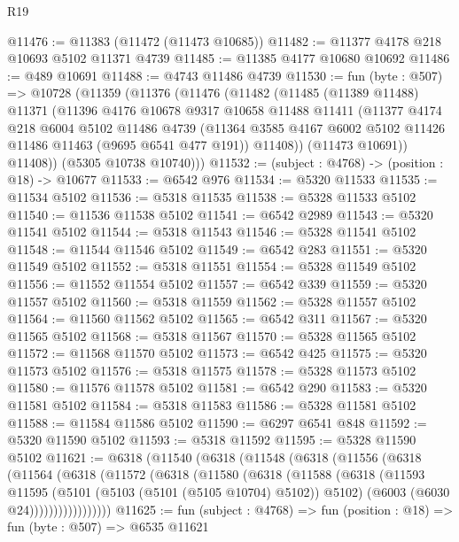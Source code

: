 \begin{lexlean}{R19}
\begin{coremodule}
{{{{{{{{{{{@11476 := @11383 (@11472 (@11473 @10685))
@11482 := @11377 @4178 @218 @10693 @5102 @11371 @4739
@11485 := @11385 @4177 @10680 @10692
@11486 := @489 @10691
@11488 := @4743 @11486 @4739
@11530 := fun (byte : @507) =>
  @10728
    (@11359
      (@11376
        (@11476
          (@11482
            (@11485
              (@11389 @11488)
              @11371
              (@11396
                @4176
                @10678
                @9317
                @10658
                @11488
                @11411
                (@11377
                  @4174
                  @218
                  @6004
                  @5102
                  @11486
                  @4739
                  (@11364 @3585 @4167 @6002 @5102 @11426 @11486 @11463 (@9695 @6541 @477 @191))
                  @11408))
              (@11473 @10691))
            @11408))
        (@5305 @10738 @10740)))
@11532 := (subject : @4768) -> (position : @18) -> @10677
@11533 := @6542 @976
@11534 := @5320 @11533
@11535 := @11534 @5102
@11536 := @5318 @11535
@11538 := @5328 @11533 @5102
@11540 := @11536 @11538 @5102
@11541 := @6542 @2989
@11543 := @5320 @11541 @5102
@11544 := @5318 @11543
@11546 := @5328 @11541 @5102
@11548 := @11544 @11546 @5102
@11549 := @6542 @283
@11551 := @5320 @11549 @5102
@11552 := @5318 @11551
@11554 := @5328 @11549 @5102
@11556 := @11552 @11554 @5102
@11557 := @6542 @339
@11559 := @5320 @11557 @5102
@11560 := @5318 @11559
@11562 := @5328 @11557 @5102
@11564 := @11560 @11562 @5102
@11565 := @6542 @311
@11567 := @5320 @11565 @5102
@11568 := @5318 @11567
@11570 := @5328 @11565 @5102
@11572 := @11568 @11570 @5102
@11573 := @6542 @425
@11575 := @5320 @11573 @5102
@11576 := @5318 @11575
@11578 := @5328 @11573 @5102
@11580 := @11576 @11578 @5102
@11581 := @6542 @290
@11583 := @5320 @11581 @5102
@11584 := @5318 @11583
@11586 := @5328 @11581 @5102
@11588 := @11584 @11586 @5102
@11590 := @6297 @6541 @848
@11592 := @5320 @11590 @5102
@11593 := @5318 @11592
@11595 := @5328 @11590 @5102
@11621 := @6318
    (@11540
      (@6318
        (@11548
          (@6318
            (@11556
              (@6318
                (@11564
                  (@6318
                    (@11572
                      (@6318
                        (@11580
                          (@6318
                            (@11588
                              (@6318
                                (@11593
                                  @11595
                                  (@5101 (@5103 (@5101 (@5105 @10704) @5102)) @5102)
                                  (@6003 (@6030 @24)))))))))))))))))
@11625 := fun (subject : @4768) => fun (position : @18) => fun (byte : @507) => @6535 @11621
}}}}}}}}}}}
\end{coremodule}
\end{lexlean}
